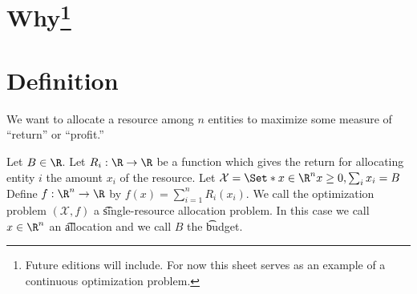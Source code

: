 
\section*{Why\footnote{Future editions will include. For now this sheet serves as an example of a continuous optimization problem.}}

\section*{Definition}

We want to allocate a resource among $n$ entities to maximize some measure of ``return'' or ``profit.''

Let $B \in \R $.
Let $R_i: \R  \to \R $ be a function which gives the return for allocating entity $i$ the amount $x_i$ of the resource.
Let $\mathcal{X}  = \Set*{x \in \R ^n}{x \geq 0, \sum_i x_i = B}$
Define $f: \R ^n \to \R $ by $f(x) = \sum_{i = 1}^{n} R_i(x_i)$.
We call the optimization problem $(\mathcal{X} , f)$ a \t{single-resource allocation problem}.
In this case we call $x \in \R ^{n}$ an \t{allocation} and we call $B$ the \t{budget}.

\blankpage